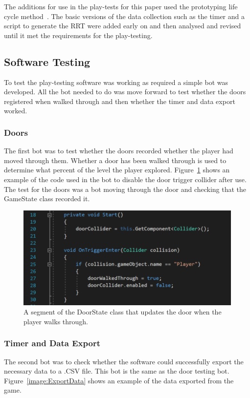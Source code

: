 \documentclass[journal]{IEEEtran}
\begin{document}
	
	The additions for use in the play-tests for this paper used the prototyping life cycle method~\cite{isaias2015}. The basic versions of the data collection such as the timer and a script to generate the RRT were added early on and then analysed and revised until it met the requirements for the play-testing. 
	
	\subsection{Software Testing} \label{softtest}
	To test the play-testing software was working as required a simple bot was developed. All the bot needed to do was move forward to test whether the doors registered when walked through and then whether the timer and data export worked.
	
	\subsubsection{Doors}
	The first bot was to test whether the doors recorded whether the player had moved through them. Whether a door has been walked through is used to determine what percent of the level the player explored. Figure~\ref{image:DoorCode} shows an example of the code used in the bot to disable the door trigger collider after use. The test for the doors was a bot moving through the door and checking that the GameState class recorded it.
	
	\begin{figure}[h]
		\includegraphics[width=1.0\linewidth]{DoorCode.png}
		\caption{A segment of the DoorState class that updates the door when the player walks through.}
		\label{image:DoorCode}
	\end{figure} 
	
	\subsubsection{Timer and Data Export}
	The second bot was to check whether the software could successfully export the necessary data to a .CSV file. This bot is the same as the door testing bot. Figure~\ref{image:ExportData} shows an example of the data exported from the game.  
	
\end{document}
